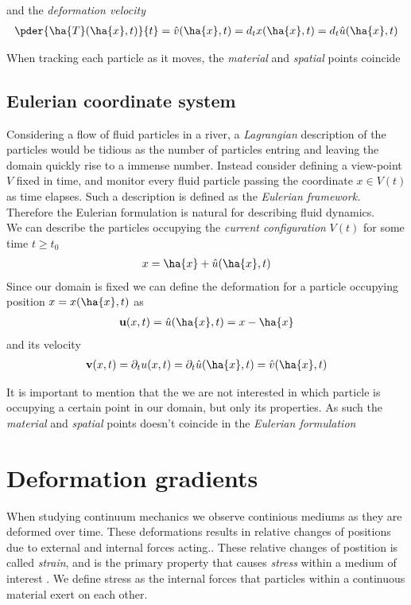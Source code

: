 and the \textit{deformation velocity}
\begin{align}
\pder{\ha{T}(\ha{x}, t)}{t} = \hat{v}(\ha{x},t) = d_t x(\ha{x},t) = d_t \hat{u}(\ha{x},t) 
\end{align}

When tracking each particle as it moves, the \textit{material} and \textit{spatial} points coincide

\subsection{Eulerian coordinate system}
Considering a flow of fluid particles in a river, a \textit{Lagrangian} description of the particles would be tidious as the number of particles entring and leaving the domain quickly rise to a immense number. 
Instead consider defining a view-point $V$ fixed in time, and monitor every fluid particle passing the coordinate $x \in V(t)$ as time elapses. Such a description is defined as the \textit{Eulerian framework.} 
Therefore the Eulerian formulation is natural for describing fluid dynamics. \\
We can describe the particles occupying the \textit{current configuration} $V(t)$ for some time $t \geq t_0$ 
\begin{align*}
x = \ha{x} + \hat{u}(\ha{x}, t)	
\end{align*}
Since our domain is fixed we can define the deformation for a particle 
occupying position $x = x(\ha{x},t)$ as
\begin{align*}
\textbf{u}(x, t) = \hat{u}(\ha{x}, t) = x - \ha{x}	\\
\end{align*}
and its velocity
\begin{align*}
\textbf{v}(x,t) = \partial_t u(x,t) = \partial_t \hat{u}(\ha{x},t) = \hat{v}(\ha{x},t)
\end{align*}

It is important to mention that the we are not interested in which particle is occupying a certain point in our domain, but only its properties. As such the \textit{material} and \textit{spatial} points doesn't coincide in the \textit{Eulerian formulation}


\section{Deformation gradients}
When studying continuum mechanics we observe continious mediums as they are deformed over time. These deformations
results in relative changes of positions due to external and internal forces acting.. These relative changes of postition is called
\textit{strain}, and is the primary property that causes \textit{stress} within a medium of interest \cite{Richter2016}. We define stress as the internal forces that particles within a continuous material exert on each other. \\

